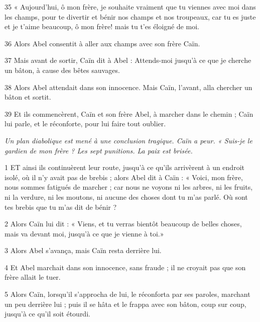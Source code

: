 \par 35 « Aujourd'hui, ô mon frère, je souhaite vraiment que tu viennes avec moi dans les champs, pour te divertir et bénir nos champs et nos troupeaux, car tu es juste et je t'aime beaucoup, ô mon frère! mais tu t'es éloigné de moi.

\par 36 Alors Abel consentit à aller aux champs avec son frère Caïn.

\par 37 Mais avant de sortir, Caïn dit à Abel : Attends-moi jusqu'à ce que je cherche un bâton, à cause des bêtes sauvages.

\par 38 Alors Abel attendait dans son innocence. Mais Caïn, l'avant, alla chercher un bâton et sortit.

\par 39 Et ils commencèrent, Caïn et son frère Abel, à marcher dans le chemin ; Caïn lui parle, et le réconforte, pour lui faire tout oublier.


\par \textit{Un plan diabolique est mené à une conclusion tragique. Caïn a peur. « Suis-je le gardien de mon frère ? Les sept punitions. La paix est brisée.}

\par 1 ET ainsi ils continuèrent leur route, jusqu'à ce qu'ils arrivèrent à un endroit isolé, où il n'y avait pas de brebis ; alors Abel dit à Caïn : « Voici, mon frère, nous sommes fatigués de marcher ; car nous ne voyons ni les arbres, ni les fruits, ni la verdure, ni les moutons, ni aucune des choses dont tu m'as parlé. Où sont tes brebis que tu m’as dit de bénir ?

\par 2 Alors Caïn lui dit : « Viens, et tu verras bientôt beaucoup de belles choses, mais va devant moi, jusqu'à ce que je vienne à toi.»

\par 3 Alors Abel s'avança, mais Caïn resta derrière lui.

\par 4 Et Abel marchait dans son innocence, sans fraude ; il ne croyait pas que son frère allait le tuer.

\par 5 Alors Caïn, lorsqu'il s'approcha de lui, le réconforta par ses paroles, marchant un peu derrière lui ; puis il se hâta et le frappa avec son bâton, coup sur coup, jusqu'à ce qu'il soit étourdi.

